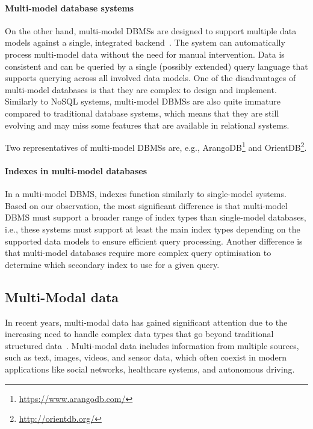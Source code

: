 \paragraph{Multi-model database systems} On the other hand, multi-model DBMSs are designed to support multiple data models against a single, integrated backend~\citep{CSUR-Jiaheng}. The system can automatically process multi-model data without the need for manual intervention. Data is consistent and can be queried by a single (possibly extended) query language that supports querying across all involved data models. One of the disadvantages of multi-model databases is that they are complex to design and implement. Similarly to NoSQL systems, multi-model DBMSs are also quite immature compared to traditional database systems, which means that they are still evolving and may miss some features that are available in relational systems.

Two representatives of multi-model DBMSs are, e.g.,  Aran\-goDB\footnote{\url{https://www.arangodb.com/}} and OrientDB\footnote{\url{http://orientdb.org/}}.

\paragraph{Indexes in multi-model databases}
In a multi-model DBMS, indexes function similarly to single-model systems. Based on our observation, the most significant difference is that multi-model DBMS must support a broader range of index types than single-model databases, i.e., these systems must support at least the main index types depending on the supported data models to ensure efficient query processing. Another difference is that multi-model databases require more complex query optimisation to determine which secondary index to use for a given query.

\subsection{Multi-Modal data}

In recent years, multi-modal data has gained significant attention due to the increasing need to handle complex data types that go beyond traditional structured data~\citep{DBLP:journals/ijautcomp/LinGGZZL23}. Multi-modal data includes information from multiple sources, such as text, images, videos, and sensor data, which often coexist in modern applications like social networks, healthcare systems, and autonomous driving.

